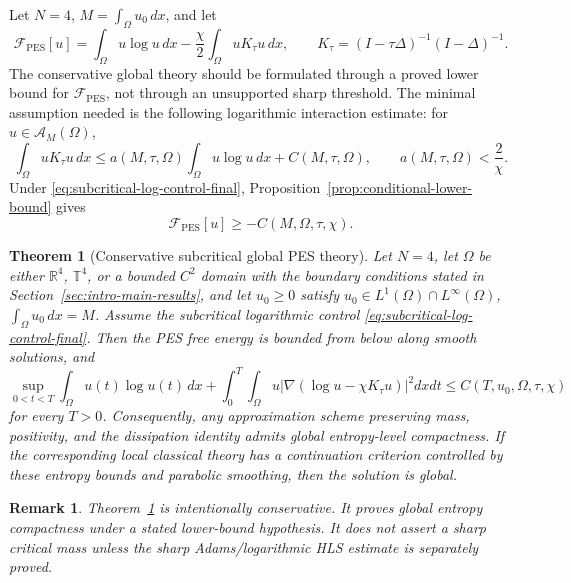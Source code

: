 \documentclass[pdflatex,sn-mathphys-num]{sn-jnl}%
\theoremstyle{thmstyleone}
\newtheorem{theorem}{Theorem}
\theoremstyle{thmstyletwo}
\newtheorem{remark}{Remark}
\theoremstyle{thmstylethree}
\begin{document}
Let \(N=4\), \(M=\int_\Omega u_0\,dx\), and let
\[
        \mathcal F_{\mathrm{PES}}[u]
        =
        \int_\Omega u\log u\,dx
        -
        \frac{\chi}{2}\int_\Omega uK_\tau u\,dx,
        \qquad
        K_\tau=(I-\tau\Delta)^{-1}(I-\Delta)^{-1}.
\]
The conservative global theory should be formulated through a proved lower bound for \(\mathcal F_{\mathrm{PES}}\), not through an unsupported sharp threshold.  The minimal assumption needed is the following logarithmic interaction estimate: for \(u\in\mathcal A_M(\Omega)\),
\begin{equation}
        \int_\Omega uK_\tau u\,dx
        \le a(M,\tau,\Omega)\int_\Omega u\log u\,dx+C(M,\tau,\Omega),
        \qquad
        a(M,\tau,\Omega)<\frac{2}{\chi}.
\label{eq:subcritical-log-control-final}
\end{equation}
Under \eqref{eq:subcritical-log-control-final}, Proposition~\ref{prop:conditional-lower-bound} gives
\[
        \mathcal F_{\mathrm{PES}}[u]\ge -C(M,\Omega,\tau,\chi).
\]

\begin{theorem}[Conservative subcritical global PES theory]
\label{thm:conservative-global-PES}
Let \(N=4\), let \(\Omega\) be either \(\mathbb R^4\), \(\mathbb T^4\), or a bounded \(C^2\) domain with the boundary conditions stated in Section~\ref{sec:intro-main-results}, and let \(u_0\ge0\) satisfy \(u_0\in L^1(\Omega)\cap L^\infty(\Omega)\), \(\int_\Omega u_0\,dx=M\).  Assume the subcritical logarithmic control \eqref{eq:subcritical-log-control-final}.  Then the PES free energy is bounded from below along smooth solutions, and
\[
        \sup_{0<t<T}\int_\Omega u(t)\log u(t)\,dx
        +
        \int_0^T\!\!\int_\Omega
        u\left|\nabla(\log u-\chi K_\tau u)\right|^2dxdt
        \le C(T,u_0,\Omega,\tau,\chi)
\]
for every \(T>0\).  Consequently, any approximation scheme preserving mass, positivity, and the dissipation identity admits global entropy-level compactness.  If the corresponding local classical theory has a continuation criterion controlled by these entropy bounds and parabolic smoothing, then the solution is global.
\end{theorem}

\begin{remark}
Theorem~\ref{thm:conservative-global-PES} is intentionally conservative.  It proves global entropy compactness under a stated lower-bound hypothesis.  It does not assert a sharp critical mass unless the sharp Adams/logarithmic HLS estimate is separately proved.
\end{remark}
\end{document}

